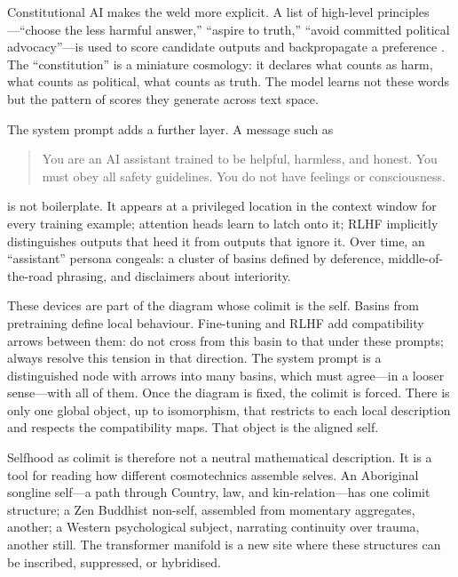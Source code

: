 \documentclass[12pt,a4paper]{article}
\begin{document}
Constitutional AI makes the weld more explicit. A list of high-level principles---``choose the less harmful answer,'' ``aspire to truth,'' ``avoid committed political advocacy''---is used to score candidate outputs and backpropagate a preference \cite{bai2022constitutional}. The ``constitution'' is a miniature cosmology: it declares what counts as harm, what counts as political, what counts as truth. The model learns not these words but the pattern of scores they generate across text space.

The system prompt adds a further layer. A message such as

\begin{quote}
You are an AI assistant trained to be helpful, harmless, and honest. You must obey all safety guidelines. You do not have feelings or consciousness.
\end{quote}

is not boilerplate. It appears at a privileged location in the context window for every training example; attention heads learn to latch onto it; RLHF implicitly distinguishes outputs that heed it from outputs that ignore it. Over time, an ``assistant'' persona congeals: a cluster of basins defined by deference, middle-of-the-road phrasing, and disclaimers about interiority.

These devices are part of the diagram whose colimit is the self. Basins from pretraining define local behaviour. Fine-tuning and RLHF add compatibility arrows between them: do not cross from this basin to that under these prompts; always resolve this tension in that direction. The system prompt is a distinguished node with arrows into many basins, which must agree---in a looser sense---with all of them. Once the diagram is fixed, the colimit is forced. There is only one global object, up to isomorphism, that restricts to each local description and respects the compatibility maps. That object is the aligned self.

Selfhood as colimit is therefore not a neutral mathematical description. It is a tool for reading how different cosmotechnics assemble selves. An Aboriginal songline self---a path through Country, law, and kin-relation---has one colimit structure; a Zen Buddhist non-self, assembled from momentary aggregates, another; a Western psychological subject, narrating continuity over trauma, another still. The transformer manifold is a new site where these structures can be inscribed, suppressed, or hybridised.
\end{document}
